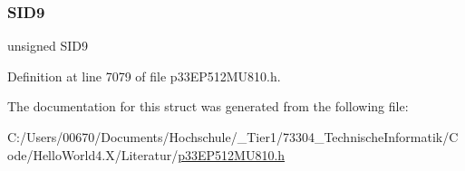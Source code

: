 \subsubsection{\texorpdfstring{S\+I\+D9}{SID9}}
{\footnotesize\ttfamily unsigned S\+I\+D9}



Definition at line 7079 of file p33\+E\+P512\+M\+U810.\+h.



The documentation for this struct was generated from the following file\+:\begin{DoxyCompactItemize}
\item 
C\+:/\+Users/00670/\+Documents/\+Hochschule/\+\_\+\+Tier1/73304\+\_\+\+Technische\+Informatik/\+Code/\+Hello\+World4.\+X/\+Literatur/\hyperlink{p33_e_p512_m_u810_8h}{p33\+E\+P512\+M\+U810.\+h}\end{DoxyCompactItemize}
